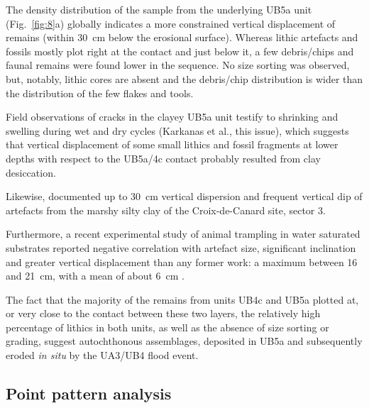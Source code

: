 \documentclass[preprint,authoryear,times]{elsarticle} %
\begin{document}
The density distribution of the sample from the underlying UB5a unit (Fig.~\ref{fig:8}a) globally indicates a more constrained vertical displacement of remains (within 30~cm below the erosional surface). Whereas lithic artefacts and fossils mostly plot right at the contact and just below it, a few debris/chips and faunal remains were found lower in the sequence. No size sorting was observed, but, notably, lithic cores are absent and the debris/chip distribution is wider than the distribution of the few flakes and tools.

Field observations of cracks in the clayey UB5a unit testify to shrinking and swelling during wet and dry cycles (Karkanas et al., this issue), which suggests that vertical displacement of some small lithics and fossil fragments at lower depths with respect to the UB5a/4c contact probably resulted from clay desiccation.

Likewise, \cite{Lenoble2004} documented up to 30~cm vertical dispersion and frequent vertical dip of artefacts from the marshy silty clay of the Croix-de-Canard site, sector 3.

Furthermore, a recent experimental study of animal trampling in water saturated substrates reported negative correlation with artefact size, significant inclination and greater vertical displacement than any former work: a maximum between 16 and 21~cm, with a mean of about 6~cm \citep{Eren2010}.

The fact that the majority of the remains from units UB4c and UB5a plotted at, or very close to the contact between these two layers, the relatively high percentage of lithics in both units, as well as the absence of size sorting or grading, suggest autochthonous assemblages, deposited in UB5a and subsequently eroded \emph{in situ} by the UA3/UB4 flood event.


\subsection{Point pattern analysis}

\end{document}
